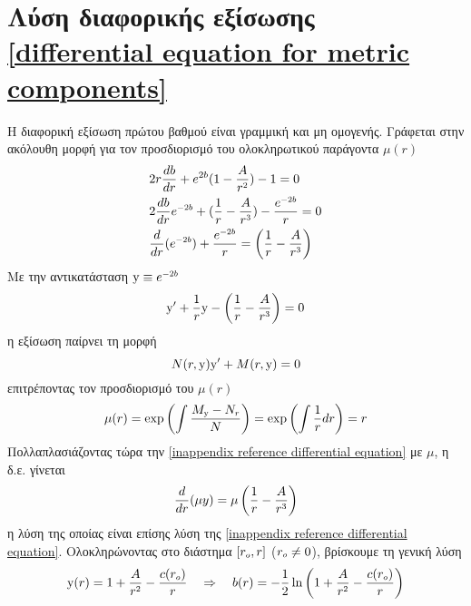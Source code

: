 \section{Λύση διαφορικής εξίσωσης \ref{differential equation for metric components}}\label{solution for metric dif eq}
Η διαφορική εξίσωση πρώτου βαθμού είναι γραμμική και μη ομογενής. Γράφεται στην ακόλουθη μορφή για τον προσδιορισμό του ολοκληρωτικού παράγοντα 
$\mu(r)$
\begin{equation}
\begin{split}
    &2r\frac{db}{dr}+e^{2b}(1-\frac{A}{r\superscr{2}})-1=0\\
    &2\frac{db}{dr}e\superscr{-2b}+(\frac{1}{r}-\frac{A}{r\superscr{3}})-\frac{e\superscr{-2b}}{r}=0\\
    &\frac{d}{dr}(e\superscr{-2b})+\frac{e\superscr{-2b}}{r}=\left(\frac{1}{r}-\frac{A}{r\superscr{3}} \right)\\
\end{split}
\end{equation}
Με την αντικατάσταση $\y\equiv e\superscr{-2b}$ 
\begin{equation}\label{inappendix reference differential equation}
    \y'+\frac{1}{r}\y - \left(\frac{1}{r}-\frac{A}{r\superscr{3}} \right) = 0
\end{equation}
η εξίσωση παίρνει τη μορφή 
\begin{equation}
    N(r,\text{y})\text{y}' + M(r,\text{y})=0
\end{equation}
επιτρέποντας τον προσδιορισμό του $\mu(r)$
\begin{equation}
    \mu(r) = \exp\left( \int \frac{M\subscr{\y}-N\subscr{r}}{N} \right) = \exp\left( \int \frac{1}{r} dr \right) = r
\end{equation}
Πολλαπλασιάζοντας τώρα την \eqref{inappendix reference differential equation} με $\mu$, η δ.ε. γίνεται
\begin{equation}
    \frac{d}{dr}(\mu y) = \mu \left( \frac{1}{r}-\frac{A}{r\superscr{3}} \right)
\end{equation}
η λύση της οποίας είναι επίσης λύση της \eqref{inappendix reference differential equation}. Oλοκληρώνοντας στο διάστημα $[r\subscr{o},r]$ ($r\subscr{o}\ne0$), βρίσκουμε τη γενική λύση 
\begin{equation}
    \y(r) = 1+\frac{A}{r\superscr{2}}-\frac{c(r\subscr{o})}{r}\quad\Rightarrow\quad b(r)=-\frac{1}{2}\ln\left(1+\frac{A}{r\superscr{2}}-\frac{c(r\subscr{o})}{r}\right)
\end{equation}